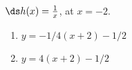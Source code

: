 {$\ds h(x) = \frac{1}{x}$, at $x=-2$.
}
{\begin{enumerate}
\item		$y = -1/4(x+2) - 1/2$
\item		$y = 4(x+2) - 1/2$
\end{enumerate}
}
